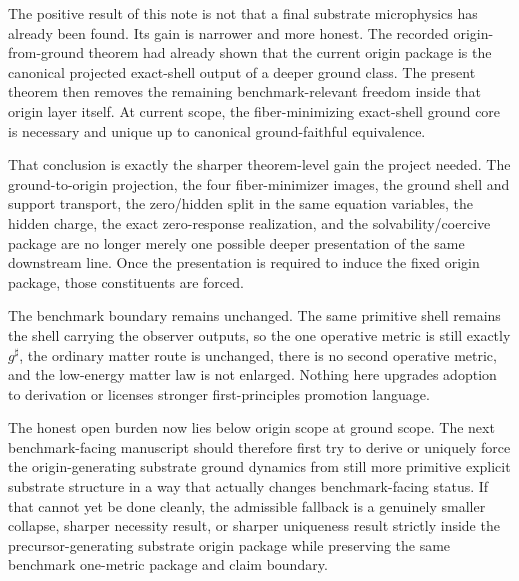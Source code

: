 \documentclass[11pt]{article}
\newcommand{\CompletedMetric}{g^{\sharp}}
\begin{document}
The positive result of this note is not that a final substrate microphysics has already been found. Its gain is narrower and more honest. The recorded origin-from-ground theorem had already shown that the current origin package is the canonical projected exact-shell output of a deeper ground class. The present theorem then removes the remaining benchmark-relevant freedom inside that origin layer itself. At current scope, the fiber-minimizing exact-shell ground core is necessary and unique up to canonical ground-faithful equivalence.

That conclusion is exactly the sharper theorem-level gain the project needed. The ground-to-origin projection, the four fiber-minimizer images, the ground shell and support transport, the zero/hidden split in the same equation variables, the hidden charge, the exact zero-response realization, and the solvability/coercive package are no longer merely one possible deeper presentation of the same downstream line. Once the presentation is required to induce the fixed origin package, those constituents are forced.

The benchmark boundary remains unchanged. The same primitive shell remains the shell carrying the observer outputs, so the one operative metric is still exactly \(\CompletedMetric\), the ordinary matter route is unchanged, there is no second operative metric, and the low-energy matter law is not enlarged. Nothing here upgrades adoption to derivation or licenses stronger first-principles promotion language.

The honest open burden now lies below origin scope at ground scope. The next benchmark-facing manuscript should therefore first try to derive or uniquely force the origin-generating substrate ground dynamics from still more primitive explicit substrate structure in a way that actually changes benchmark-facing status. If that cannot yet be done cleanly, the admissible fallback is a genuinely smaller collapse, sharper necessity result, or sharper uniqueness result strictly inside the precursor-generating substrate origin package while preserving the same benchmark one-metric package and claim boundary.
\end{document}
